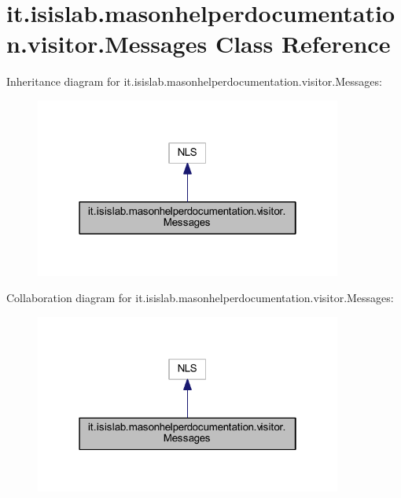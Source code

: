 \hypertarget{classit_1_1isislab_1_1masonhelperdocumentation_1_1visitor_1_1_messages}{\section{it.\-isislab.\-masonhelperdocumentation.\-visitor.\-Messages Class Reference}
\label{classit_1_1isislab_1_1masonhelperdocumentation_1_1visitor_1_1_messages}
}


Inheritance diagram for it.\-isislab.\-masonhelperdocumentation.\-visitor.\-Messages\-:\nopagebreak
\begin{figure}[H]
\begin{center}
\leavevmode
\includegraphics[width=286pt]{classit_1_1isislab_1_1masonhelperdocumentation_1_1visitor_1_1_messages__inherit__graph}
\end{center}
\end{figure}


Collaboration diagram for it.\-isislab.\-masonhelperdocumentation.\-visitor.\-Messages\-:\nopagebreak
\begin{figure}[H]
\begin{center}
\leavevmode
\includegraphics[width=286pt]{classit_1_1isislab_1_1masonhelperdocumentation_1_1visitor_1_1_messages__coll__graph}
\end{center}
\end{figure}
